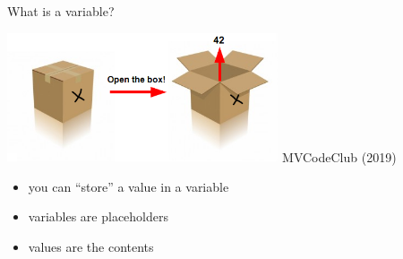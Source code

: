 \documentclass[
  american,
  ignorenonframetext,
]{beamer}
\providecommand{\tightlist}{%
  \setlength{\itemsep}{0pt}\setlength{\parskip}{0pt}}
\begin{document}
\begin{frame}{What is a variable?}
\protect\hypertarget{what-is-a-variable}{}

\includegraphics[width=0.6\textwidth,height=\textheight]{02_Variables_Assignments/var_box.png}
MVCodeClub (2019)

\begin{itemize}
\tightlist
\item
  you can ``store'' a value in a variable
\item
  variables are placeholders
\item
  values are the contents
\end{itemize}


\end{frame}
\end{document}
